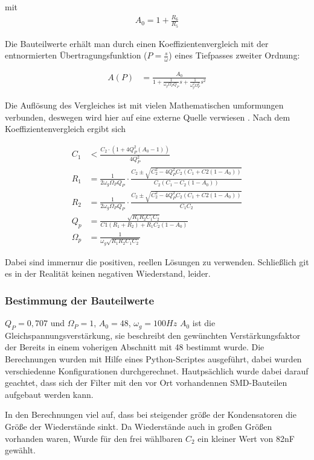 mit
\begin{align*}
A_0=1+\frac{R_6}{R_5}
\end{align*}


Die Bauteilwerte erhält man durch einen Koeffizientenvergleich mit der entnormierten
Übertragungsfunktion ($P=\frac{s}{\omega}$) eines Tiefpasses zweiter Ordnung:

\begin{align*}
A(P)&=\frac{A_0}{1+\frac{1}{\omega_g\Omega_PQ_P}s+\frac{1}{\omega_g^2\Omega_P^2}s^2}
\end{align*}

Die Auflösung des Vergleiches ist mit vielen Mathematischen umformungen verbunden, deswegen wird hier auf eine
externe Quelle verwiesen \cite[Seite: 102]{Krucker2000}.
Nach dem Koeffizientenvergleich ergibt sich

\begin{align*}
C_1&<\frac{C_2\cdot(1+4Q^2_P(A_0-1))}{4Q^2_P}\\
R_1&=\frac{1}{2\omega_g\Omega_PQ_P} \cdot \frac{C_2\pm\sqrt{C_2^2-4Q^2_PC_2(C_1+C2(1-A_0))}}{C_2(C_1-C_2(1-A_0))}   \\
R_2&=\frac{1}{2\omega_g\Omega_PQ_P} \cdot \frac{C_2\pm\sqrt{C_2^2-4Q^2_PC_2(C_1+C2(1-A_0))}}{C_1C_2}  \\
Q_p&=\frac{\sqrt{R_1R_2C_1C_2}}{C1(R_1+R_2)+R_1C_2(1-A_0)}\\
\Omega_p&=\frac{1}{\omega_g\sqrt{R_1R_2C_1C_2}}
\end{align*}

Dabei sind immernur die positiven, reellen Lösungen zu verwenden. Schließlich git es in der Realität keinen negativen Wiederstand, leider.


\subsubsection{Bestimmung der Bauteilwerte}


$Q_P=0,707$ und $\Omega_P=1$, $A_0=48$, $\omega_g = 100Hz$
$A_0$ ist die Gleichspannungsverstärkung, sie beschreibt den gewünchten Verstärkungsfaktor der Bereits in einem voherigen
Abschnitt mit 48 bestimmt wurde. Die Berechnungen wurden mit Hilfe eines Python-Scriptes ausgeführt, dabei wurden verschiedenne
Konfigurationen durchgerechnet. Hautpsächlich wurde dabei darauf geachtet, dass sich der Filter mit den vor Ort vorhandennen SMD-Bauteilen
aufgebaut werden kann.

In den Berechnungen viel auf, dass bei steigender größe der Kondensatoren die Größe der Wiederstände sinkt. Da Wiederstände auch in großen Größen vorhanden waren,
Wurde für den frei wählbaren $C_2$ ein kleiner Wert von 82nF gewählt.


